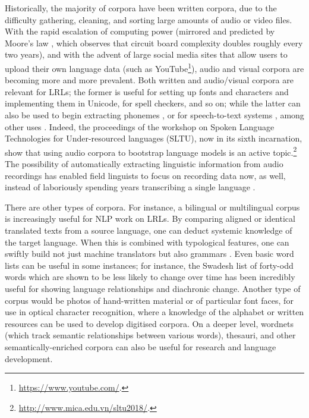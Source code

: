 Historically, the majority of corpora have been written corpora, due to the difficulty gathering, cleaning, and sorting large amounts of audio or video files. With the rapid escalation of computing power (mirrored and predicted by Moore's law \citep{schaller1997moore}, which observes that circuit board complexity doubles roughly every two years), and with the advent of large social media sites that allow users to upload their own language data (such as YouTube\footnote{\href{https://www.youtube.com/}{https://www.youtube.com/}. }), audio and visual corpora are becoming more and more prevalent. Both written and audio/visual corpora are relevant for LRLs; the former is useful for setting up fonts and characters and implementing them in Unicode, for spell checkers, and so on; while the latter can also be used to begin extracting phonemes \citep{kempton2014discovering, muller2017improving}, or for speech-to-text systems \citep{fraga2015active, fraga2015improving}, among other uses \citep{adams2017automatic}. Indeed, the proceedings of the workshop on Spoken Language Technologies for Under-resourced languages (SLTU), now in its sixth incarnation, show that using audio corpora to bootstrap language models is an active topic.\footnote{\href{http://www.mica.edu.vn/sltu2018/}{http://www.mica.edu.vn/sltu2018/}. } The possibility of automatically extracting linguistic information from audio recordings has enabled field linguists to focus on recording data now, as well, instead of laboriously spending years transcribing a single language \citep{bird2014aikuma}.

There are other types of corpora. For instance, a bilingual or multilingual corpus is increasingly useful for NLP work on LRLs. By comparing aligned or identical translated texts from a source language, one can deduct systemic knowledge of the target language. When this is combined with typological features, one can swiftly build not just machine translators \citep{lewis2010haitian} but also grammars \citep{bender2016linguistic}. Even basic word lists can be useful in some instances; for instance, the Swadesh list of forty-odd words which are shown to be less likely to change over time \citep{swadesh1955towards} has been incredibly useful for showing language relationships and diachronic change. Another type of corpus would be photos of hand-written material or of particular font faces, for use in optical character recognition, where a knowledge of the alphabet or written resources can be used to develop digitised corpora. On a deeper level, wordnets (which track semantic relationships between various words), thesauri, and other semantically-enriched corpora can also be useful for research and language development.

